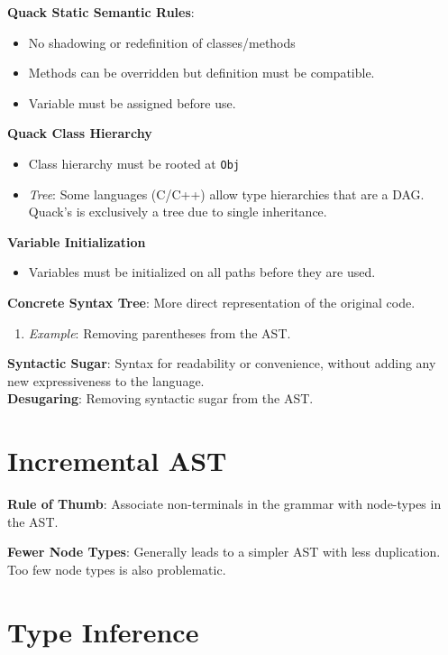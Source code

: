 \documentclass[10pt,twocolumn]{report}
\begin{document}
\textbf{Quack Static Semantic Rules}:
\begin{itemize}
  \item No shadowing or redefinition of classes/methods
  \item Methods can be overridden but definition must be compatible.
  \item Variable must be assigned before use.
\end{itemize}

\textbf{Quack Class Hierarchy}
\begin{itemize}
  \item Class hierarchy must be rooted at \texttt{Obj}
  \item \emph{Tree}: Some languages (C/C++) allow type hierarchies that are a DAG\@.  Quack's is exclusively a tree due to single inheritance.
\end{itemize}

\textbf{Variable Initialization}
\begin{itemize}
  \item Variables must be initialized on all paths before they are used.
\end{itemize}

\textbf{Concrete Syntax Tree}: More direct representation of the original code.
\begin{enumerate}
  \item \emph{Example}: Removing parentheses from the AST.
\end{enumerate}

\textbf{Syntactic Sugar}: Syntax for readability or convenience, without adding any new expressiveness to the language.\\
\textbf{Desugaring}: Removing syntactic sugar from the AST.

\section{Incremental AST}

\textbf{Rule of Thumb}: Associate non-terminals in the grammar with node-types in the AST.

\textbf{Fewer Node Types}: Generally leads to a simpler AST with less duplication.  Too few node types is also problematic.



\section{Type Inference}
\end{document}
